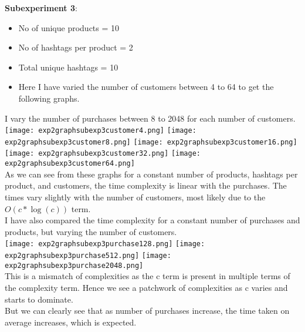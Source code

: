 \documentclass[12pt]{article}
\begin{document}
\textbf{Subexperiment 3}:\\
\begin{itemize}
    \item No of unique products = 10
    \item No of hashtags per product = 2
    \item Total unique hashtags = 10
    \item Here I have varied the number of customers between 4 to 64 to get the following graphs.
\end{itemize}
I vary the number of purchases between 8 to 2048 for each number of customers.\\
\texttt{[image: exp2graphsubexp3customer4.png]}
\texttt{[image: exp2graphsubexp3customer8.png]}
\texttt{[image: exp2graphsubexp3customer16.png]}
\texttt{[image: exp2graphsubexp3customer32.png]}
\texttt{[image: exp2graphsubexp3customer64.png]}\\
As we can see from these graphs for a constant number of products, hashtags per product, and customers, the time complexity is linear with the purchases. The times vary slightly with the number of customers, most likely due to the $O(c*\log(c))$ term.\\
I have also compared the time complexity for a constant number of purchases and products, but varying the number of customers.\\
\texttt{[image: exp2graphsubexp3purchase128.png]}
\texttt{[image: exp2graphsubexp3purchase512.png]}
\texttt{[image: exp2graphsubexp3purchase2048.png]}\\
This is a mismatch of complexities as the c term is present in multiple terms of the complexity term. Hence we see a patchwork of complexities as c varies and starts to dominate.\\
But we can clearly see that as number of purchases increase, the time taken on average increases, which is expected.\\
\end{document}
